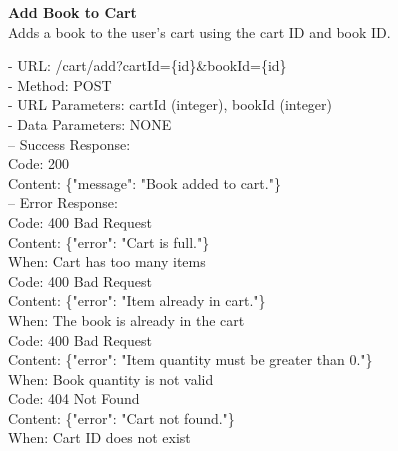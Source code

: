 \begin{flushleft}
    \textbf{Add Book to Cart} \\
    Adds a book to the user's cart using the cart ID and book ID.

    - URL: /cart/add?cartId=\{id\}\&bookId=\{id\} \\
    - Method: POST \\
    - URL Parameters: cartId (integer), bookId (integer) \\
    - Data Parameters: NONE \\
    – Success Response: \\
    Code: 200 \\
    Content: \{"message": "Book added to cart."\} \\
    – Error Response: \\
    Code: 400 Bad Request \\
    Content: \{"error": "Cart is full."\} \\
    When: Cart has too many items \\
    Code: 400 Bad Request \\
    Content: \{"error": "Item already in cart."\} \\
    When: The book is already in the cart \\
    Code: 400 Bad Request \\
    Content: \{"error": "Item quantity must be greater than 0."\} \\
    When: Book quantity is not valid \\
    Code: 404 Not Found \\
    Content: \{"error": "Cart not found."\} \\
    When: Cart ID does not exist
\end{flushleft}

